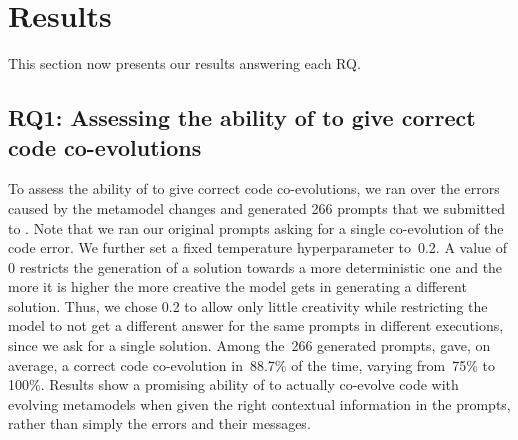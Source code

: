\section{Results}
\label{results}
This section now presents our results answering each RQ. 

\subsection{RQ1: Assessing the ability of \LLM to give correct code co-evolutions }


To assess the ability of \LLM to give correct code co-evolutions, %
we ran over the errors caused by the metamodel changes and generated 266 prompts that we submitted to \LLM. 
Note that we ran our original prompts asking for a single co-evolution of the code error. We further set a fixed temperature hyperparameter to~0.2. A value of 0 restricts the generation of a solution towards a more deterministic one and the more it is higher the more creative the model gets in generating a different solution. Thus, we chose 0.2 to allow only little creativity while restricting the model to not get a different answer for the same prompts in different executions, since we ask for a single solution. 
%
Among the~266 generated prompts, \LLM gave, on average, a correct code co-evolution in~88.7\% of the time, varying from~75\% to 100\%. 
Results show a promising ability of \LLM to actually co-evolve code with evolving metamodels when given the right contextual information in the prompts, rather than simply the errors and their messages. 



